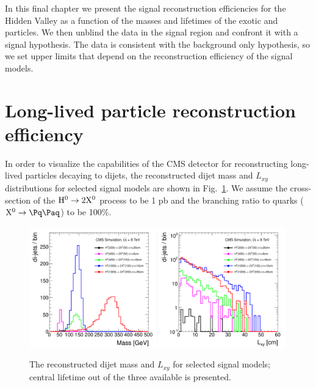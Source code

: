In this final chapter we present the signal reconstruction efficiencies for the
 Hidden Valley
as a function of the masses and lifetimes of the exotic \Higgs and \X particles. 
We then unblind the data in the signal region and confront it with a
 signal hypothesis. The data is consistent with the background only hypothesis, so we
set upper limits that depend on the reconstruction efficiency of the signal models.

\section{Long-lived particle reconstruction efficiency}
\label{sec:signalefficiency}

In order to visualize the capabilities of the CMS detector for reconstructing long-lived particles decaying to 
dijets, 
the reconstructed dijet mass and $L_{xy}$ distributions for selected signal models are shown in Fig.~\ref{fig:signal}.
We assume the cross-section of the $\mathrm{H}^{0} \to 2\mathrm{X^{0}}$ process to be 1 pb and the branching 
ratio to quarks ($\X \to \qq$) to be 100\%.

\begin{figure}[htbp]
\centering
\includegraphics[width=0.49\textwidth]{plots/signal/mass.pdf}
\includegraphics[width=0.49\textwidth]{plots/signal/Lxy.pdf}
\caption{The reconstructed dijet mass and $L_{xy}$ for selected signal models; central lifetime out of the three available is presented.\label{fig:signal}}
\end{figure}

